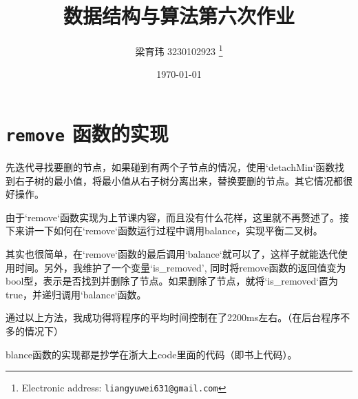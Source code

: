 \documentclass[UTF8]{ctexart}
\begin{document}
\pagestyle{fancy}
\fancyhead{}
\rhead{\today}
\title{数据结构与算法第六次作业}

\author{梁育玮 3230102923
  \thanks{Electronic address: \texttt{liangyuwei631@gmail.com}}}


\date{\today}

\maketitle

\section{\texttt{remove} 函数的实现}
先迭代寻找要删的节点，如果碰到有两个子节点的情况，使用`detachMin`函数找到右子树的最小值，将最小值从右子树分离出来，替换要删的节点。其它情况都很好操作。

由于`remove`函数实现为上节课内容，而且没有什么花样，这里就不再赘述了。接下来讲一下如何在`remove`函数运行过程中调用balance，实现平衡二叉树。

其实也很简单，在`remove`函数的最后调用`balance`就可以了，这样子就能迭代使用时间。另外，我维护了一个变量`is\_removed', 同时将remove函数的返回值变为bool型，表示是否找到并删除了节点。如果删除了节点，就将`is\_removed`置为true，并递归调用`balance`函数。

通过以上方法，我成功得将程序的平均时间控制在了2200ms左右。（在后台程序不多的情况下）

blance函数的实现都是抄学在浙大上code里面的代码（即书上代码）。
\end{document}
